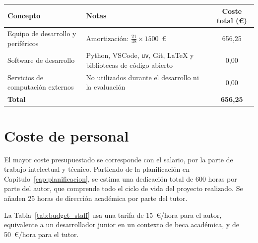 \documentclass[12pt]{report} %
\begin{document}
\begin{table}[H]
    {\begin{tabular}{|p{4.1cm}|p{5.2cm}|c|}
            \hline
            \textbf{Concepto}                  & \textbf{Notas}                                                             & \textbf{Coste total (€)} \\
            \hline
            Equipo de desarrollo y periféricos & Amortización: $\frac{21}{48} \times 1500$~€                                & 656{,}25                 \\
            \hline
            Software de desarrollo             & Python, VSCode, \texttt{uv}, Git, \LaTeX{} y bibliotecas de código abierto & 0{,}00                    \\
            \hline
            Servicios de computación externos  & No utilizados durante el desarrollo ni la evaluación                       & 0{,}00                    \\
            \hline
            \textbf{Total}                     &                                                                            & \textbf{656{,}25}        \\
            \hline
        \end{tabular}}
\end{table}

\section{Coste de personal}

El mayor coste presupuestado se corresponde con el salario, por la parte de trabajo intelectual y técnico. Partiendo de la planificación en Capítulo~\ref{cap:planificacion}, se estima una dedicación total de 600 horas por parte del autor, que comprende todo el ciclo de vida del proyecto realizado. Se añaden 25 horas de dirección académica por parte del tutor.

La Tabla~\ref{tab:budget_staff} usa una tarifa de 15~€/hora para el autor, equivalente a un desarrollador junior en un contexto de beca académica, y de 50~€/hora para el tutor.
\end{document}
